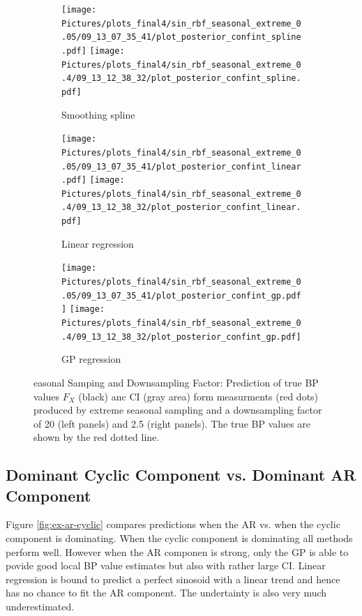 \begin{figure}
\begin{subfigure}{\textwidth}
    \centering
    \texttt{[image: 
        Pictures/plots\_final4/sin\_rbf\_seasonal\_extreme\_0.05/09\_13\_07\_35\_41/plot\_posterior\_confint\_spline.pdf]}
    \texttt{[image: 
        Pictures/plots\_final4/sin\_rbf\_seasonal\_extreme\_0.4/09\_13\_12\_38\_32/plot\_posterior\_confint\_spline.pdf]}
  \caption{Smoothing spline}
\end{subfigure}

\begin{subfigure}{\textwidth}
    \centering
    \texttt{[image: 
        Pictures/plots\_final4/sin\_rbf\_seasonal\_extreme\_0.05/09\_13\_07\_35\_41/plot\_posterior\_confint\_linear.pdf]}
    \texttt{[image: 
        Pictures/plots\_final4/sin\_rbf\_seasonal\_extreme\_0.4/09\_13\_12\_38\_32/plot\_posterior\_confint\_linear.pdf]}
  \caption{Linear regression }
\end{subfigure}

\begin{subfigure}{\textwidth}
    \centering
    \texttt{[image: 
        Pictures/plots\_final4/sin\_rbf\_seasonal\_extreme\_0.05/09\_13\_07\_35\_41/plot\_posterior\_confint\_gp.pdf]}
    \texttt{[image: 
        Pictures/plots\_final4/sin\_rbf\_seasonal\_extreme\_0.4/09\_13\_12\_38\_32/plot\_posterior\_confint\_gp.pdf]}
  \caption{GP regression}
\end{subfigure}\hfill

\caption[Seasonal Samping and Downsampling Factor]{easonal Samping and Downsampling Factor:
    Prediction of true BP values $F_X$ (black)
    anc CI (gray area) form measurments (red dots) produced by extreme seasonal sampling and
    a downsampling factor of 20 (left panels) and 2.5 (right panels).
    The true BP values are shown by the red dotted line.}
\label{fig:ex-seasonal-sampling}
\end{figure}



\subsection{Dominant Cyclic Component vs. Dominant AR Component}

Figure \ref{fig:ex-ar-cyclic} compares
predictions when the AR vs. when the cyclic component is dominating.
When the cyclic component is dominating
all methods perform well.
However when the AR componen is strong, only the GP is able
to povide good local BP value estimates but also
with rather large CI.
Linear regression is bound to predict a perfect sinosoid with a linear
trend and hence has no chance to fit the AR component.
The undertainty is also very much underestimated.


